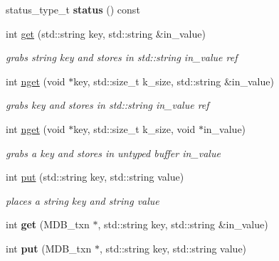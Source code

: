 \begin{DoxyCompactItemize}
\mbox{\label{structmods_1_1lmdb_1_1__db__handle_a84c388c496a013ecc2e46fec23d5e7c4}} 
status\+\_\+type\+\_\+t {\bfseries status} () const
\item 
int \hyperlink{structmods_1_1lmdb_1_1__db__handle_a7087d7d0a9cf7476492f89baedd97a36}{get} (std\+::string key, std\+::string \&in\+\_\+value)
\begin{DoxyCompactList}\small\item\em grabs string key and stores in std\+::string in\+\_\+value ref \end{DoxyCompactList}\item 
int \hyperlink{structmods_1_1lmdb_1_1__db__handle_a2d6b287c6a1c63139df32e26bd8531cd}{nget} (void $\ast$key, std\+::size\+\_\+t k\+\_\+size, std\+::string \&in\+\_\+value)
\begin{DoxyCompactList}\small\item\em grabs key and stores in std\+::string in\+\_\+value ref \end{DoxyCompactList}\item 
int \hyperlink{structmods_1_1lmdb_1_1__db__handle_a60ac3fa83da7725016dab8fbe5ca4094}{nget} (void $\ast$key, std\+::size\+\_\+t k\+\_\+size, void $\ast$in\+\_\+value)
\begin{DoxyCompactList}\small\item\em grabs a key and stores in untyped buffer in\+\_\+value \end{DoxyCompactList}\item 
int \hyperlink{structmods_1_1lmdb_1_1__db__handle_a84218a2943429838fc41d027b2131089}{put} (std\+::string key, std\+::string value)
\begin{DoxyCompactList}\small\item\em places a string key and string value \end{DoxyCompactList}\item 
\mbox{\label{structmods_1_1lmdb_1_1__db__handle_a174aba1966475e1d8074796019c84a7e}} 
int {\bfseries get} (M\+D\+B\+\_\+txn $\ast$, std\+::string key, std\+::string \&in\+\_\+value)
\item 
\mbox{\label{structmods_1_1lmdb_1_1__db__handle_aaa29ba2dfeaff18c62ac5b7dc736677f}} 
int {\bfseries put} (M\+D\+B\+\_\+txn $\ast$, std\+::string key, std\+::string value)
\item 

\end{DoxyCompactItemize}
